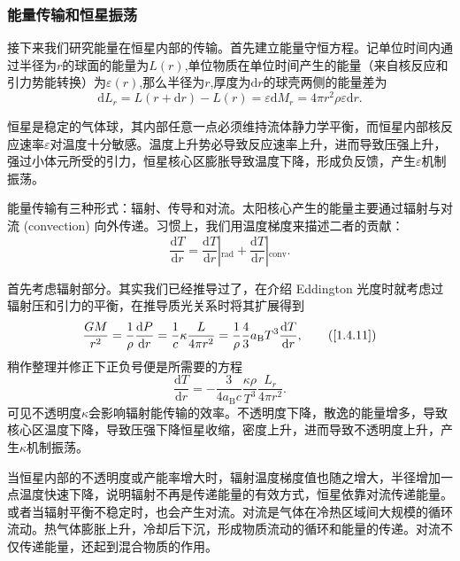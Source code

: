 \documentclass[../天体物理基础.tex]{subfiles}
\begin{document}
\subsubsection{能量传输和恒星振荡}
接下来我们研究能量在恒星内部的传输。首先建立能量守恒方程。记单位时间内通过半径为$r$的球面的能量为$L\left(r\right)$,单位物质在单位时间产生的能量（来自核反应和引力势能转换）为$\varepsilon\left(r\right)$,那么半径为$r$,厚度为$\mathrm{d}r$的球壳两侧的能量差为
\begin{equation}
\mathrm{d}L_{r}=L\left(r+\mathrm{d}r\right)-L\left(r\right)=\varepsilon\mathrm{d}M_{r}=4\pi{}r^{2}\rho\varepsilon\mathrm{d}r.
\end{equation}

恒星是稳定的气体球，其内部任意一点必须维持流体静力学平衡，而恒星内部核反应速率$\varepsilon$对温度十分敏感。温度上升势必导致反应速率上升，进而导致压强上升，强过小体元所受的引力，恒星核心区膨胀导致温度下降，形成负反馈，产生$\varepsilon$机制振荡。

能量传输有三种形式：辐射、传导和对流。太阳核心产生的能量主要通过辐射与对流 (convection) 向外传递。习惯上，我们用温度梯度来描述二者的贡献：
\begin{equation}
\frac{\mathrm{d}T}{\mathrm{d}r}=\left.\frac{\mathrm{d}T}{\mathrm{d}r}\right\vert{}_{\text{rad}}+\left.\frac{\mathrm{d}T}{\mathrm{d}r}\right\vert{}_{\text{conv}}.
\end{equation}

首先考虑辐射部分。其实我们已经推导过了，在介绍 Eddington 光度时就考虑过辐射压和引力的平衡，在推导质光关系时将其扩展得到
\begin{equation}
\frac{GM}{r^{2}}=\frac{1}{\rho}\frac{\mathrm{d}P}{\mathrm{d}r}=\frac{1}{c}\kappa\frac{L}{4\pi r^{2}}=\frac{1}{\rho}\frac{4}{3}a_{\text{B}}T^{3}\frac{\mathrm{d}T}{\mathrm{d}r},\tag{\ref{1.4.11}}
\end{equation}
稍作整理并修正下正负号便是所需要的方程
\begin{equation}
\frac{\mathrm{d}T}{\mathrm{d}r}=-\frac{3}{4a_{\text{B}}c}\frac{\kappa\rho}{T^{3}}\frac{L_{r}}{4\pi r^{2}}.
\end{equation}
可见不透明度$\kappa$会影响辐射能传输的效率。不透明度下降，散逸的能量增多，导致核心区温度下降，导致压强下降恒星收缩，密度上升，进而导致不透明度上升，产生$\kappa$机制振荡。

当恒星内部的不透明度或产能率增大时，辐射温度梯度值也随之增大，半径增加一点温度快速下降，说明辐射不再是传递能量的有效方式，恒星依靠对流传递能量。或者当辐射平衡不稳定时，也会产生对流。对流是气体在冷热区域间大规模的循环流动。热气体膨胀上升，冷却后下沉，形成物质流动的循环和能量的传递。对流不仅传递能量，还起到混合物质的作用。
\end{document}
